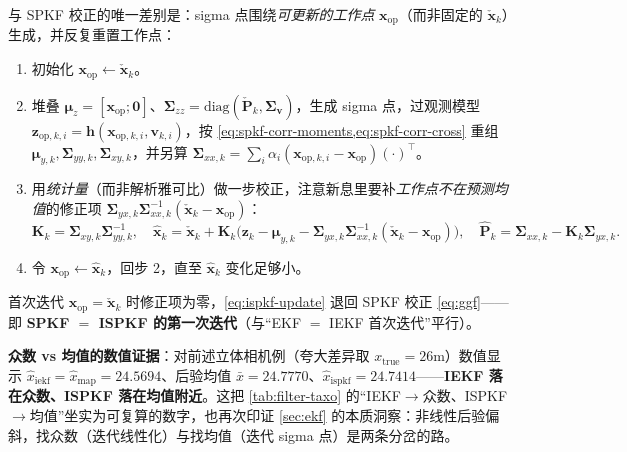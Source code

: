 \begin{algo}\label{algo:ispkf}
与 SPKF 校正的唯一差别是：sigma 点围绕\emph{可更新的工作点} $\mathbf{x}_{\text{op}}$（而非固定的 $\check{\mathbf{x}}_k$）生成，并反复重置工作点\cite{barfoot2024state}：
\begin{enumerate}
  \item 初始化 $\mathbf{x}_{\text{op}}\leftarrow\check{\mathbf{x}}_k$。
  \item 堆叠 $\boldsymbol{\mu}_z=[\mathbf{x}_{\text{op}};\mathbf{0}]$、$\boldsymbol{\Sigma}_{zz}=\mathrm{diag}(\check{\mathbf{P}}_k,\boldsymbol{\Sigma}_{\mathbf{v}})$，生成 sigma 点，过观测模型 $\mathbf{z}_{\text{op},k,i}=\mathbf{h}(\mathbf{x}_{\text{op},k,i},\mathbf{v}_{k,i})$，按 \cref{eq:spkf-corr-moments,eq:spkf-corr-cross} 重组 $\boldsymbol{\mu}_{y,k},\boldsymbol{\Sigma}_{yy,k},\boldsymbol{\Sigma}_{xy,k}$，并另算 $\boldsymbol{\Sigma}_{xx,k}=\sum_i\alpha_i(\mathbf{x}_{\text{op},k,i}-\mathbf{x}_{\text{op}})(\cdot)^\top$。
  \item 用\emph{统计量}（而非解析雅可比）做一步校正，注意新息里要补\emph{工作点不在预测均值}的修正项 $\boldsymbol{\Sigma}_{yx,k}\boldsymbol{\Sigma}_{xx,k}^{-1}(\check{\mathbf{x}}_k-\mathbf{x}_{\text{op}})$：
  \begin{equation}
    \mathbf{K}_k=\boldsymbol{\Sigma}_{xy,k}\boldsymbol{\Sigma}_{yy,k}^{-1},\quad
    \hat{\mathbf{x}}_k=\check{\mathbf{x}}_k+\mathbf{K}_k\big(\mathbf{z}_k-\boldsymbol{\mu}_{y,k}-\boldsymbol{\Sigma}_{yx,k}\boldsymbol{\Sigma}_{xx,k}^{-1}(\check{\mathbf{x}}_k-\mathbf{x}_{\text{op}})\big),\quad
    \hat{\mathbf{P}}_k=\boldsymbol{\Sigma}_{xx,k}-\mathbf{K}_k\boldsymbol{\Sigma}_{yx,k}.
    \label{eq:ispkf-update}
  \end{equation}
  \item 令 $\mathbf{x}_{\text{op}}\leftarrow\hat{\mathbf{x}}_k$，回步 2，直至 $\hat{\mathbf{x}}_k$ 变化足够小。
\end{enumerate}
首次迭代 $\mathbf{x}_{\text{op}}=\check{\mathbf{x}}_k$ 时修正项为零，\cref{eq:ispkf-update} 退回 SPKF 校正 \cref{eq:ggf}——即 \textbf{SPKF $=$ ISPKF 的第一次迭代}（与“EKF $=$ IEKF 首次迭代”平行）。
\end{algo}

\noindent\textbf{众数 vs 均值的数值证据}：对前述立体相机例（夸大差异取 $x_{\text{true}}=26$m）数值显示 $\hat{x}_{\text{iekf}}=\hat{x}_{\text{map}}=24.5694$、后验均值 $\bar{x}=24.7770$、$\hat{x}_{\text{ispkf}}=24.7414$——\textbf{IEKF 落在众数、ISPKF 落在均值附近}\cite{barfoot2024state}。这把 \cref{tab:filter-taxo} 的“IEKF$\to$众数、ISPKF$\to$均值”坐实为可复算的数字，也再次印证 \cref{sec:ekf} 的本质洞察：非线性后验偏斜，找众数（迭代线性化）与找均值（迭代 sigma 点）是两条分岔的路。


